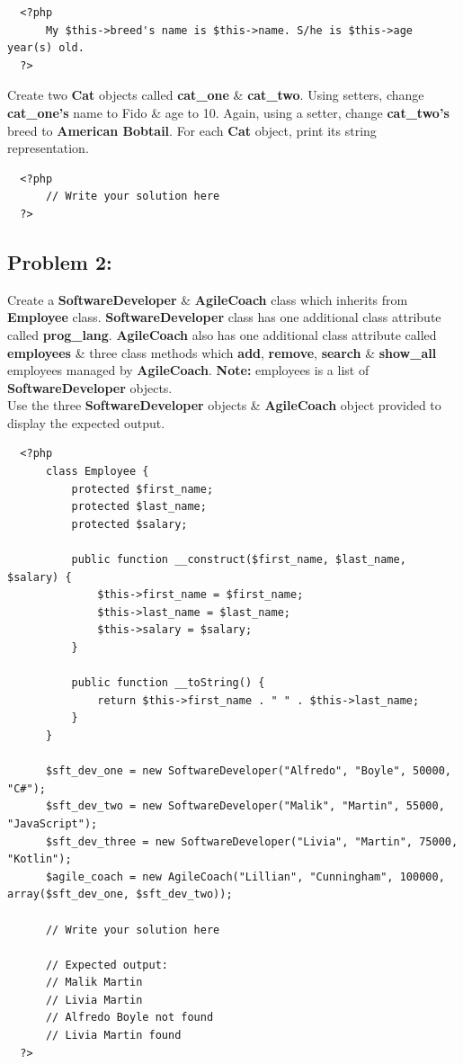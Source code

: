 \documentclass{article}
\begin{document}
\begin{verbatim}
  <?php
      My $this->breed's name is $this->name. S/he is $this->age year(s) old.
  ?>
\end{verbatim}

Create two \textbf{Cat} objects called \textbf{cat\_one} \& \textbf{cat\_two}. Using setters, change \textbf{cat\_one's} name to Fido \& age to 10. Again, using a setter, change \textbf{cat\_two's} breed to \textbf{American Bobtail}. For each \textbf{Cat} object, print its string representation.

\begin{verbatim}
  <?php
      // Write your solution here
  ?>
\end{verbatim}

\subsection*{Problem 2:} 
Create a \textbf{SoftwareDeveloper} \& \textbf{AgileCoach} class which inherits from \textbf{Employee} class. \textbf{SoftwareDeveloper} class has one additional class attribute called \textbf{prog\_lang}. \textbf{AgileCoach} also has one additional class attribute called \textbf{employees} \& three class methods which \textbf{add}, \textbf{remove}, \textbf{search} \& \textbf{show\_all} employees managed by \textbf{AgileCoach}. \textbf{Note:} employees is a list of \textbf{SoftwareDeveloper} objects. \\

Use the three \textbf{SoftwareDeveloper} objects \& \textbf{AgileCoach} object provided to display the expected output.

\begin{verbatim}
  <?php
      class Employee {
          protected $first_name;
          protected $last_name;
          protected $salary;

          public function __construct($first_name, $last_name, $salary) {
              $this->first_name = $first_name;
              $this->last_name = $last_name;
              $this->salary = $salary;
          }

          public function __toString() {
              return $this->first_name . " " . $this->last_name;
          }
      }

      $sft_dev_one = new SoftwareDeveloper("Alfredo", "Boyle", 50000, "C#");
      $sft_dev_two = new SoftwareDeveloper("Malik", "Martin", 55000, "JavaScript");
      $sft_dev_three = new SoftwareDeveloper("Livia", "Martin", 75000, "Kotlin");
      $agile_coach = new AgileCoach("Lillian", "Cunningham", 100000, array($sft_dev_one, $sft_dev_two));

      // Write your solution here

      // Expected output:
      // Malik Martin
      // Livia Martin
      // Alfredo Boyle not found
      // Livia Martin found
  ?>
\end{verbatim}
\end{document}
